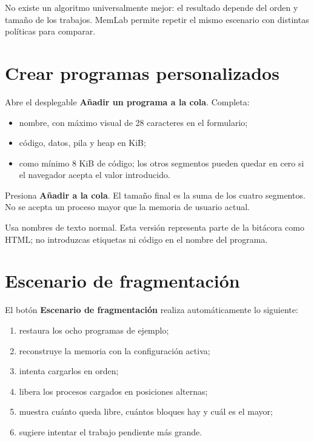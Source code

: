 \documentclass[11pt,a4paper]{article}
\newcommand{\control}[1]{\textsf{\textbf{#1}}}
\begin{document}
No existe un algoritmo universalmente mejor: el resultado depende del orden y
tamaño de los trabajos. MemLab permite repetir el mismo escenario con distintas
políticas para comparar.

\section{Crear programas personalizados}

Abre el desplegable \control{Añadir un programa a la cola}. Completa:

\begin{itemize}
  \item nombre, con máximo visual de 28 caracteres en el formulario;
  \item código, datos, pila y heap en KiB;
  \item como mínimo 8 KiB de código; los otros segmentos pueden quedar en cero si
  el navegador acepta el valor introducido.
\end{itemize}

Presiona \control{Añadir a la cola}. El tamaño final es la suma de los cuatro
segmentos. No se acepta un proceso mayor que la memoria de usuario actual.

\begin{aviso}
Usa nombres de texto normal. Esta versión representa parte de la bitácora como HTML;
no introduzcas etiquetas ni código en el nombre del programa.
\end{aviso}

\section{Escenario de fragmentación}

El botón \control{Escenario de fragmentación} realiza automáticamente lo siguiente:

\begin{enumerate}
  \item restaura los ocho programas de ejemplo;
  \item reconstruye la memoria con la configuración activa;
  \item intenta cargarlos en orden;
  \item libera los procesos cargados en posiciones alternas;
  \item muestra cuánto queda libre, cuántos bloques hay y cuál es el mayor;
  \item sugiere intentar el trabajo pendiente más grande.
\end{enumerate}
\end{document}
